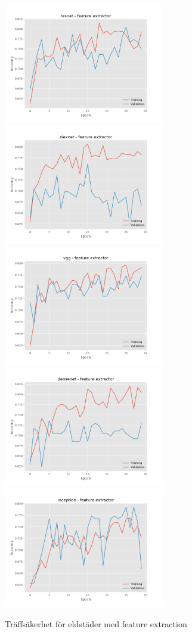 \documentclass[]{kththesis}
\begin{document}
\begin{figure}[h]
  \includegraphics[width=7cm]{f_a_resnet_fe}
  \includegraphics[width=7cm]{f_a_alexnet_fe}
  \includegraphics[width=7cm]{f_a_vgg_fe}
  \includegraphics[width=7cm]{f_a_densenet_fe}
  \includegraphics[width=7cm]{f_a_inception_fe}
  \caption{Träffsäkerhet för eldstäder med feature extraction}
  \label{fig:f_a_1}
\end{figure}
\end{document}
